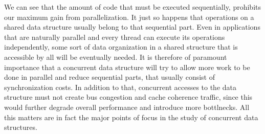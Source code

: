 We can see that the amount of code that must be executed sequentially, prohibits our maximum gain from parallelization. It just so happens that operations on a shared data structure usually belong to that sequential part. Even in applications that are naturally parallel and every thread can execute its operations independently, some sort of data organization in a shared structure that is accessible by all will be eventually needed.  It is therefore of paramount importance that a concurrent data structure will try to allow more work to be done in parallel and reduce sequential parts, that usually consist of synchronization costs. In addition to that, concurrent accesses to the data structure must not create bus congestion and cache coherence traffic, since this would further degrade overall performance and introduce more bottlnecks. All this matters are in fact the major points of focus in the study of concurrent data structures.
